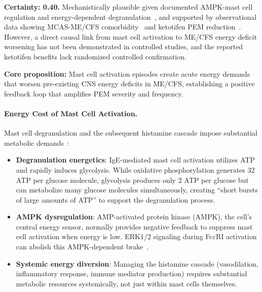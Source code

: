 \begin{speculation}
\label{spec:mcas-energy-amplifier}

\textbf{Certainty: 0.40.} Mechanistically plausible given documented AMPK-mast cell regulation and energy-dependent degranulation~\cite{Theoharides2021Cells}, and supported by observational data showing MCAS-ME/CFS comorbidity~\cite{Wirth2023,Frioni2025MCAS} and ketotifen PEM reduction~\cite{Weinstock2024Ketotifen}. However, a direct causal link from mast cell activation to ME/CFS energy deficit worsening has not been demonstrated in controlled studies, and the reported ketotifen benefits lack randomized controlled confirmation.

\textbf{Core proposition:} Mast cell activation episodes create acute energy demands that worsen pre-existing CNS energy deficits in ME/CFS, establishing a positive feedback loop that amplifies PEM severity and frequency.

\paragraph{Energy Cost of Mast Cell Activation.}

Mast cell degranulation and the subsequent histamine cascade impose substantial metabolic demands~\cite{Theoharides2021Cells}:

\begin{itemize}
    \item \textbf{Degranulation energetics}: IgE-mediated mast cell activation utilizes ATP and rapidly induces glycolysis. While oxidative phosphorylation generates 32 ATP per glucose molecule, glycolysis produces only 2 ATP per glucose but can metabolize many glucose molecules simultaneously, creating ``short bursts of large amounts of ATP'' to support the degranulation process.

    \item \textbf{AMPK dysregulation}: AMP-activated protein kinase (AMPK), the cell's central energy sensor, normally provides negative feedback to suppress mast cell activation when energy is low. ERK1/2 signaling during Fc$\varepsilon$RI activation can abolish this AMPK-dependent brake~\cite{Theoharides2021Cells}.

    \item \textbf{Systemic energy diversion}: Managing the histamine cascade (vasodilation, inflammatory response, immune mediator production) requires substantial metabolic resources systemically, not just within mast cells themselves.


\end{itemize}
\end{speculation}
